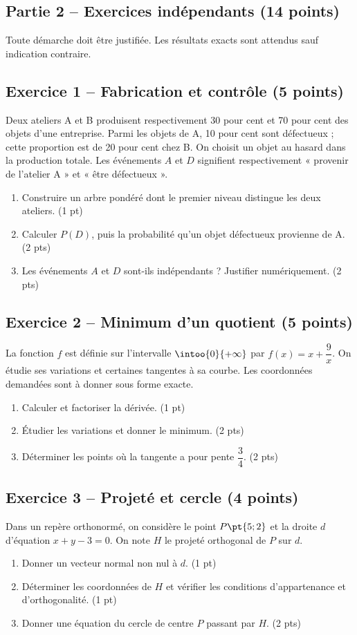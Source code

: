 \mxnewpage\subsection*{Partie 2 -- Exercices indépendants (14 points)}
Toute démarche doit être justifiée. Les résultats exacts sont attendus sauf indication contraire.
\subsection*{Exercice 1 -- Fabrication et contrôle (5 points)}
Deux ateliers A et B produisent respectivement 30 pour cent et 70 pour cent des objets d’une entreprise. Parmi les objets de A, 10 pour cent sont défectueux ; cette proportion est de 20 pour cent chez B. On choisit un objet au hasard dans la production totale. Les événements $A$ et $D$ signifient respectivement « provenir de l’atelier A » et « être défectueux ».
\begin{enumerate}
\item Construire un arbre pondéré dont le premier niveau distingue les deux ateliers. \hfill(1 pt)
\item Calculer $P(D)$, puis la probabilité qu’un objet défectueux provienne de A. \hfill(2 pts)
\item Les événements $A$ et $D$ sont-ils indépendants ? Justifier numériquement. \hfill(2 pts)
\end{enumerate}
\subsection*{Exercice 2 -- Minimum d’un quotient (5 points)}
La fonction $f$ est définie sur l’intervalle $\intoo{0}{+\infty}$ par $f(x)=x+\dfrac9x$. On étudie ses variations et certaines tangentes à sa courbe. Les coordonnées demandées sont à donner sous forme exacte.
\begin{enumerate}
\item Calculer et factoriser la dérivée. \hfill(1 pt)
\item Étudier les variations et donner le minimum. \hfill(2 pts)
\item Déterminer les points où la tangente a pour pente $\dfrac{3}{4}$. \hfill(2 pts)
\end{enumerate}
\subsection*{Exercice 3 -- Projeté et cercle (4 points)}
Dans un repère orthonormé, on considère le point $P\pt{5;2}$ et la droite $d$ d’équation $x+y-3=0$. On note $H$ le projeté orthogonal de $P$ sur $d$.
\begin{enumerate}
\item Donner un vecteur normal non nul à $d$. \hfill(1 pt)
\item Déterminer les coordonnées de $H$ et vérifier les conditions d’appartenance et d’orthogonalité. \hfill(1 pt)
\item Donner une équation du cercle de centre $P$ passant par $H$. \hfill(2 pts)
\end{enumerate}

